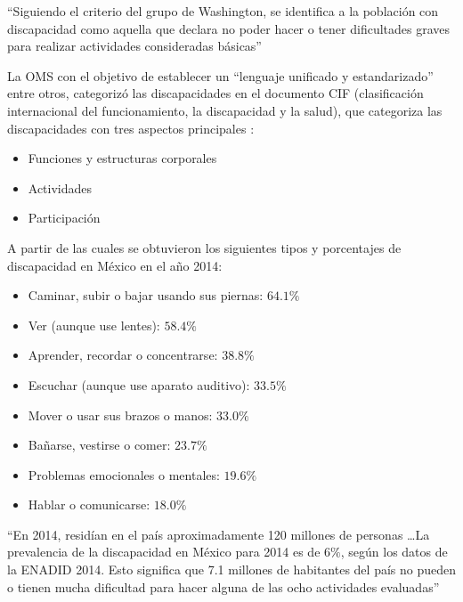 
``Siguiendo el criterio del grupo de Washington, se identifica a la
 poblaci\'on con discapacidad como aquella que declara no poder hacer 
 o tener dificultades graves para realizar actividades consideradas 
 b\'asicas''\cite{INEGI2014}


La OMS con el objetivo de establecer un ``lenguaje unificado y
 estandarizado''\cite{9241545429} entre otros, categoriz\'o las 
 discapacidades en el documento CIF (clasificaci\'on internacional 
 del funcionamiento, la discapacidad y la salud), que categoriza 
 las discapacidades con tres aspectos principales \cite{9241545429}:


\begin{itemize}
	\item Funciones y estructuras corporales
	\item Actividades
	\item Participaci\'on
\end{itemize}


A partir de las cuales se obtuvieron los siguientes tipos y porcentajes 
 de discapacidad en M\'exico en el a\~no 2014\cite{INEGI2014}:


\begin{itemize}
	\item {Caminar, subir o bajar usando sus piernas: $64.1\%$ }
	\item {Ver (aunque use lentes): $58.4\%$ }
  	\item {Aprender, recordar o concentrarse: $38.8\%$ } 
	\item {Escuchar (aunque use aparato auditivo): $33.5\%$ } 
	\item {Mover o usar sus brazos o manos: $33.0\%$ }
 	\item {Ba\~narse, vestirse o comer: $23.7\%$ }
	\item {Problemas emocionales o mentales: $19.6\%$ }
	\item {Hablar o comunicarse: $18.0\%$ }
\end{itemize}


``En 2014, resid\'ian en el pa\'is aproximadamente 120 millones de personas
 \ldots La prevalencia de la discapacidad en M\'exico para 2014 es de $6\%$, 
 seg\'un los datos de la ENADID 2014. Esto significa que 7.1 millones de 
 habitantes del pa\'is no pueden o tienen mucha dificultad para hacer 
 alguna de las ocho actividades evaluadas''\cite{INEGI2014}


